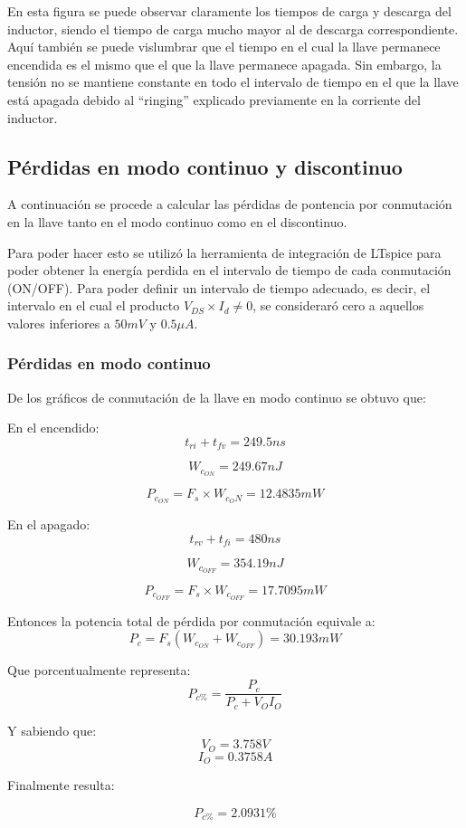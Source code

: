 \documentclass[e4_tp1_main.tex]{subfiles}
\begin{document}
		En esta figura se puede observar claramente los tiempos de carga y descarga del inductor, siendo el tiempo de  carga mucho mayor al de descarga correspondiente. Aquí también se puede vislumbrar que el tiempo en el cual la llave permanece encendida es el mismo que el que la llave permanece apagada. Sin embargo, la tensión no se mantiene constante en todo el intervalo de tiempo en el que la llave está apagada debido al ``ringing'' explicado previamente en la corriente del inductor.
		

	\subsection{Pérdidas en modo continuo y discontinuo}
	A continuación se procede a calcular las pérdidas de pontencia por conmutación en la llave tanto en el modo continuo como en el discontinuo. 
	
	Para poder hacer esto se utilizó la herramienta de integración de LTspice para poder obtener la energía perdida en el intervalo de tiempo de cada conmutación (ON/OFF). Para poder definir un intervalo de tiempo adecuado, es decir, el intervalo en el cual el producto $V_{DS}\times I_d\neq 0$, se consideraró cero a aquellos valores inferiores a $50mV$ y $0.5\mu A$.
	
	\subsubsection{Pérdidas en modo continuo}
	De los gráficos de conmutación de la llave en modo continuo se obtuvo que:
	
	En el encendido:
	\[t_{ri}+t_{fv}=249.5ns\]
	
	\[W_{c_{ON}}=249.67nJ\]
	
	\[P_{c_{ON}}=F_s\times W_{c_ON}=12.4835mW\]
	
	En el apagado:
	\[t_{rv}+t_{fi}=480ns\]
	
	\[W_{c_{OFF}}=354.19nJ \]
	
	\[P_{c_{OFF}}=F_s\times W_{c_{OFF}}=17.7095mW\]
	
	Entonces la potencia total de pérdida por conmutación equivale a:
	\[P_c=F_s(W_{c_{ON}}+W_{c_{OFF}})=30.193mW\]
	
	Que porcentualmente representa:
	\[P_{c\%}=\frac{P_c}{P_c+V_OI_O}\]
	
	Y sabiendo que:
	\[V_O=3.758V\]
	\[I_O=0.3758A\]
	
	Finalmente resulta:
	
	
	\[P_{c\%}=2.0931\%\]
	
\end{document}
